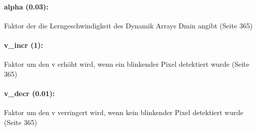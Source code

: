 \documentclass{article}
\begin{document}
	\paragraph*{alpha (0.03):} Faktor der die Lerngeschwindigkeit des Dynamik Arrays Dmin angibt (Seite 365)
	\paragraph*{v\_incr (1):} Faktor um den v erh\"oht wird, wenn ein blinkender Pixel detektiert wurde (Seite 365)
	\paragraph*{v\_decr (0.01):} Faktor um den v verringert wird, wenn kein blinkender Pixel detektiert wurde (Seite 365)


	
\end{document}
